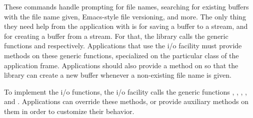 These commands handle prompting for file names, searching for existing
buffers with the file name given, Emacs-style file versioning, and
more.  The only thing they need help from the application with is for
saving a buffer to a stream, and for creating a buffer from a stream.
For that, the \sysname{} library calls the generic functions
 and
 respectively.
Applications that use the \sysname{} i/o facility must provide methods
on these generic functions, specialized on the particular class of the
application frame.  Applications should also provide a method on
 so that the \sysname{}
library can create a new buffer whenever a non-existing file name is
given.

To implement the i/o functions, the \sysname{} i/o facility calls the
generic functions ,
,
,
, and
.  Applications can override these
methods, or provide auxiliary methods on them in order to customize
their behavior.
